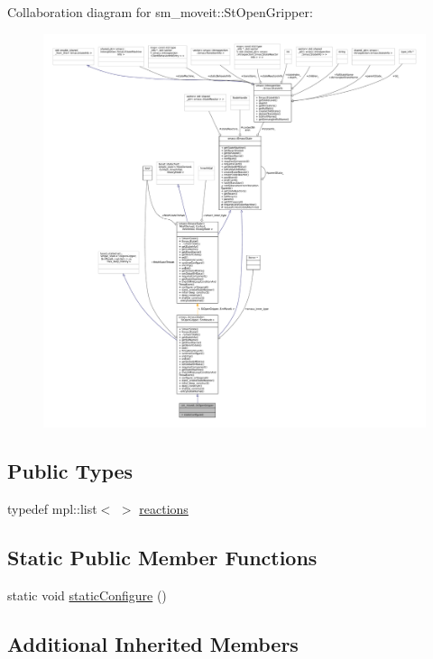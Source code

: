 Collaboration diagram for sm\+\_\+moveit\+:\+:St\+Open\+Gripper\+:
\nopagebreak
\begin{figure}[H]
\begin{center}
\leavevmode
\includegraphics[width=350pt]{structsm__moveit_1_1StOpenGripper__coll__graph}
\end{center}
\end{figure}
\subsection*{Public Types}
\begin{DoxyCompactItemize}
\item 
typedef mpl\+::list$<$  $>$ \hyperlink{structsm__moveit_1_1StOpenGripper_acbdcf81248d1bbdb08a9cf3a6a5983e4}{reactions}
\end{DoxyCompactItemize}
\subsection*{Static Public Member Functions}
\begin{DoxyCompactItemize}
\item 
static void \hyperlink{structsm__moveit_1_1StOpenGripper_ac79e655f04fecc0e6468a9df23488d7e}{static\+Configure} ()
\end{DoxyCompactItemize}
\subsection*{Additional Inherited Members}


